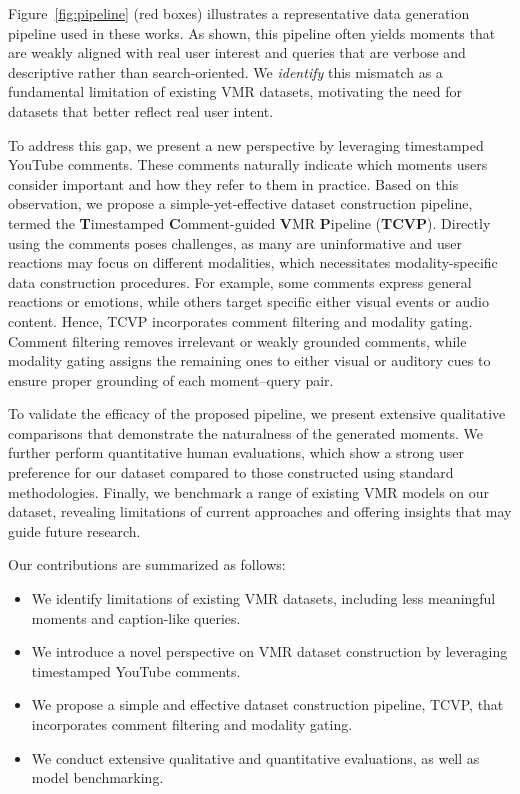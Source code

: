 \documentclass[11pt]{article}
\newcommand{\figref}[1]{Figure~\ref{#1}}
\begin{document}
\figref{fig:pipeline} (red boxes) illustrates a representative data generation pipeline used in these works.
As shown, this pipeline often yields moments that are weakly aligned with real user interest and queries that are verbose and descriptive rather than search-oriented. 
We \textit{identify} this mismatch as a fundamental limitation of existing VMR datasets, motivating the need for datasets that better reflect real user intent.

To address this gap, we present a new perspective by leveraging timestamped YouTube comments.
These comments naturally indicate which moments users consider important and how they refer to them in practice. 
Based on this observation, we propose a simple-yet-effective dataset construction pipeline, termed the \textbf{T}imestamped \textbf{C}omment-guided \textbf{V}MR \textbf{P}ipeline (\textbf{TCVP}).
Directly using the comments poses challenges, as many are uninformative and user reactions may focus on different modalities, which necessitates modality-specific data construction procedures. For example, some comments express general reactions or emotions, while others target specific either visual events or audio content. Hence, TCVP incorporates comment filtering and modality gating.
Comment filtering removes irrelevant or weakly grounded comments, while modality gating assigns the remaining ones to either visual or auditory cues to ensure proper grounding of each moment–query pair.

To validate the efficacy of the proposed pipeline, we present extensive qualitative comparisons that demonstrate the naturalness of the generated moments.
We further perform quantitative human evaluations, which show a strong user preference for our dataset compared to those constructed using standard methodologies.
Finally, we benchmark a range of existing VMR models on our dataset, revealing limitations of current approaches and offering insights that may guide future research.

Our contributions are summarized as follows:
\begin{itemize}[leftmargin=*, itemsep=.2pt, topsep=1.5pt]
    \item We identify limitations of existing VMR datasets, including less meaningful moments and caption-like queries.
    \item We introduce a novel perspective on VMR dataset construction by leveraging timestamped YouTube comments.
    \item We propose a simple and effective dataset construction pipeline, TCVP, that incorporates comment filtering and modality gating.
    \item We conduct extensive qualitative and quantitative evaluations, as well as model benchmarking.
\end{itemize}
\end{document}
